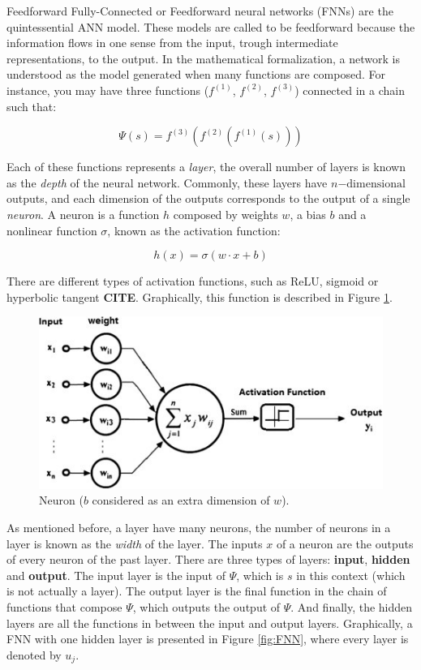 Feedforward Fully-Connected or Feedforward neural networks (FNNs) are the quintessential ANN model. These models are called to be feedforward because the information flows in one sense from the input, trough intermediate representations, to the output. In the mathematical formalization, a network is understood as the model generated when many functions are composed. For instance, you may have three functions ($f^{(1)}$, $f^{(2)}$, $f^{(3)}$) connected in a chain such that:

\begin{equation}
    \Psi(s) = f^{(3)}(f^{(2)}(f^{(1)}(s)))
\end{equation}

Each of these functions represents a \emph{layer}, the overall number of layers is known as the \emph{depth} of the neural network. Commonly, these layers have $n\mathrm{-dimensional}$ outputs, and each dimension of the outputs corresponds to the output of a single \emph{neuron}. A neuron is a function $h$ composed by weights $w$, a bias $b$ and a nonlinear function $\sigma$, known as the activation function:

\begin{equation}
    h(x) = \sigma(w \cdot x + b)
    \label{eq:h}
\end{equation}

There are different types of activation functions, such as ReLU, sigmoid or hyperbolic tangent \textbf{CITE}. Graphically, this function is described in Figure \ref{fig:neuron}.

\begin{figure}[H]
    \centering
    \includegraphics[width=0.6\linewidth]{imagenes/cap1/neuron.jpeg}
    \caption{Neuron ($b$ considered as an extra dimension of $w$).}
    \label{fig:neuron}
\end{figure}

As mentioned before, a layer have many neurons, the number of neurons in a layer is known as the \emph{width} of the layer. The inputs $x$ of a neuron are the outputs of every neuron of the past layer.  There are three types of layers: \textbf{input}, \textbf{hidden} and \textbf{output}. The input layer is the input of $\Psi$, which is $s$ in this context (which is not actually a layer). The output layer is the final function in the chain of functions that compose $\Psi$, which outputs the output of $\Psi$. And finally, the hidden layers are all the functions in between the input and output layers. Graphically, a FNN with one hidden layer is presented in Figure \ref{fig:FNN}, where every layer is denoted by $u_{j}$.

